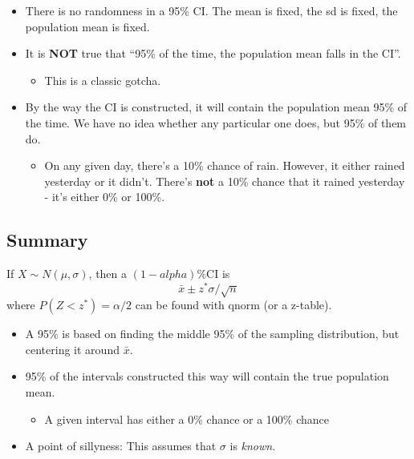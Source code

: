 \documentclass[
  letterpaper,
  DIV=11,
  numbers=noendperiod]{scrreprt}
\providecommand{\tightlist}{%
  \setlength{\itemsep}{0pt}\setlength{\parskip}{0pt}}\usepackage{longtable,booktabs,array}
\begin{document}
\begin{itemize}
\tightlist
\item
  There is no randomness in a 95\% CI. The mean is fixed, the sd is
  fixed, the population mean is fixed.
\item
  It is \textbf{NOT} true that ``95\% of the time, the population mean
  falls in the CI''.

  \begin{itemize}
  \tightlist
  \item
    This is a classic gotcha.
  \end{itemize}
\item
  By the way the CI is constructed, it will contain the population mean
  95\% of the time. We have no idea whether any particular one does, but
  95\% of them do.

  \begin{itemize}
  \tightlist
  \item
    On any given day, there's a 10\% chance of rain. However, it either
    rained yesterday or it didn't. There's \textbf{not} a 10\% chance
    that it rained yesterday - it's either 0\% or 100\%.
  \end{itemize}
\end{itemize}

\hypertarget{summary-3}{%
\subsection{Summary}\label{summary-3}}

If \(X\sim N(\mu,\sigma)\), then a \((1-alpha)\%\)CI is \[
\bar x \pm z^*\sigma/\sqrt{n}
\] where \(P(Z < z^*) = \alpha/2\) can be found with qnorm (or a
z-table).

\begin{itemize}
\tightlist
\item
  A 95\% is based on finding the middle 95\% of the sampling
  distribution, but centering it around \(\bar x\).
\item
  95\% of the intervals constructed this way will contain the true
  population mean.

  \begin{itemize}
  \tightlist
  \item
    A given interval has either a 0\% chance or a 100\% chance
  \end{itemize}
\item
  A point of sillyness: This assumes that \(\sigma\) is \emph{known}.
\end{itemize}
\end{document}
